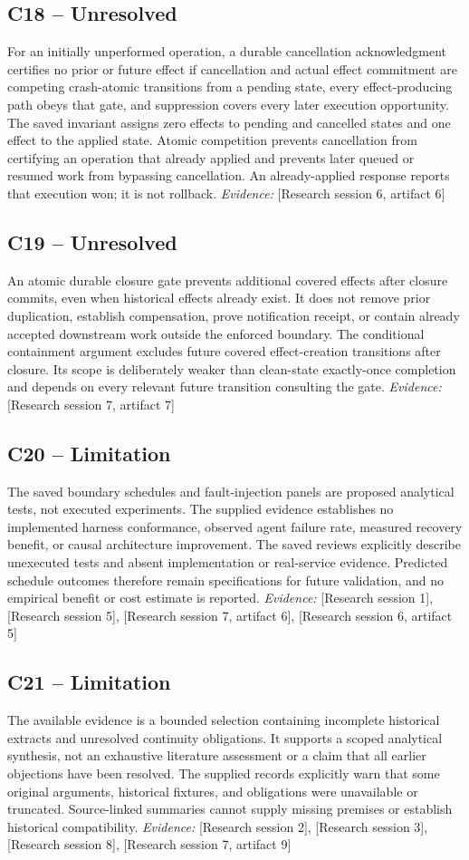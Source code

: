\documentclass[11pt]{article}
\begin{document}
\begin{sloppypar}
\subsection{C18 -- Unresolved}
For an initially unperformed operation, a durable cancellation acknowledgment certifies no prior or future effect if cancellation and actual effect commitment are competing crash-atomic transitions from a pending state, every effect-producing path obeys that gate, and suppression covers every later execution opportunity.
The saved invariant assigns zero effects to pending and cancelled states and one effect to the applied state. Atomic competition prevents cancellation from certifying an operation that already applied and prevents later queued or resumed work from bypassing cancellation. An already-applied response reports that execution won; it is not rollback.
\textit{Evidence: }[Research session 6, artifact 6]
\subsection{C19 -- Unresolved}
An atomic durable closure gate prevents additional covered effects after closure commits, even when historical effects already exist. It does not remove prior duplication, establish compensation, prove notification receipt, or contain already accepted downstream work outside the enforced boundary.
The conditional containment argument excludes future covered effect-creation transitions after closure. Its scope is deliberately weaker than clean-state exactly-once completion and depends on every relevant future transition consulting the gate.
\textit{Evidence: }[Research session 7, artifact 7]
\subsection{C20 -- Limitation}
The saved boundary schedules and fault-injection panels are proposed analytical tests, not executed experiments. The supplied evidence establishes no implemented harness conformance, observed agent failure rate, measured recovery benefit, or causal architecture improvement.
The saved reviews explicitly describe unexecuted tests and absent implementation or real-service evidence. Predicted schedule outcomes therefore remain specifications for future validation, and no empirical benefit or cost estimate is reported.
\textit{Evidence: }[Research session 1], [Research session 5], [Research session 7, artifact 6], [Research session 6, artifact 5]
\subsection{C21 -- Limitation}
The available evidence is a bounded selection containing incomplete historical extracts and unresolved continuity obligations. It supports a scoped analytical synthesis, not an exhaustive literature assessment or a claim that all earlier objections have been resolved.
The supplied records explicitly warn that some original arguments, historical fixtures, and obligations were unavailable or truncated. Source-linked summaries cannot supply missing premises or establish historical compatibility.
\textit{Evidence: }[Research session 2], [Research session 3], [Research session 8], [Research session 7, artifact 9]

\end{sloppypar}
\end{document}
